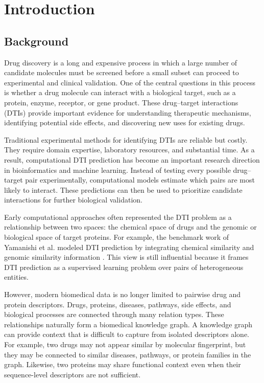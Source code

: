 \chapter{Introduction}
\label{chap:introduction}

\section{Background}

Drug discovery is a long and expensive process in which a large number of
candidate molecules must be screened before a small subset can proceed to
experimental and clinical validation. One of the central questions in this
process is whether a drug molecule can interact with a biological target, such
as a protein, enzyme, receptor, or gene product. These drug--target
interactions (DTIs) provide important evidence for understanding therapeutic
mechanisms, identifying potential side effects, and discovering new uses for
existing drugs.

Traditional experimental methods for identifying DTIs are reliable but costly.
They require domain expertise, laboratory resources, and substantial time. As a
result, computational DTI prediction has become an important research direction
in bioinformatics and machine learning. Instead of testing every possible
drug--target pair experimentally, computational models estimate which pairs are
most likely to interact. These predictions can then be used to prioritize
candidate interactions for further biological validation.

Early computational approaches often represented the DTI problem as a
relationship between two spaces: the chemical space of drugs and the genomic or
biological space of target proteins. For example, the benchmark work of
Yamanishi et al. modeled DTI prediction by integrating chemical similarity and
genomic similarity information \cite{yamanishi2008prediction}. This view is
still influential because it frames DTI prediction as a supervised learning
problem over pairs of heterogeneous entities.

However, modern biomedical data is no longer limited to pairwise drug and
protein descriptors. Drugs, proteins, diseases, pathways, side effects, and
biological processes are connected through many relation types. These
relationships naturally form a biomedical knowledge graph. A knowledge graph
can provide context that is difficult to capture from isolated descriptors
alone. For example, two drugs may not appear similar by molecular fingerprint,
but they may be connected to similar diseases, pathways, or protein families in
the graph. Likewise, two proteins may share functional context even when their
sequence-level descriptors are not sufficient.

